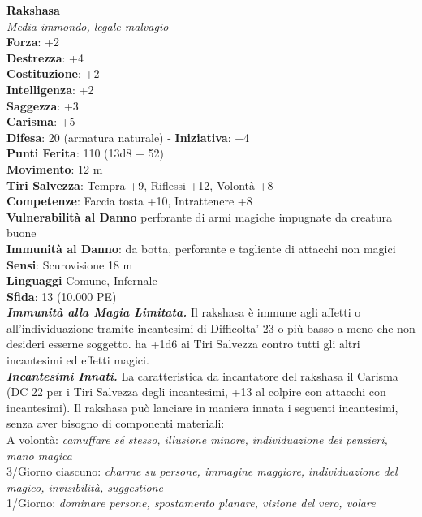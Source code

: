 \begin{multicols}{2}
\medskip\textbf{Rakshasa}\\
\emph{Media immondo, legale malvagio}\\
\textbf{Forza}: +2\\
\textbf{Destrezza}: +4\\
\textbf{Costituzione}: +2\\
\textbf{Intelligenza}: +2\\
\textbf{Saggezza}: +3\\
\textbf{Carisma}: +5\\
\textbf{Difesa}: 20 (armatura naturale) - \textbf{Iniziativa}: +4\\
\textbf{Punti Ferita}: 110 (13d8 + 52)\\
\textbf{Movimento}: 12 m\\
\textbf{Tiri Salvezza}: Tempra +9, Riflessi +12, Volontà +8 \\
\textbf{Competenze}: Faccia tosta +10, Intrattenere +8\\
\textbf{Vulnerabilità al Danno} perforante di armi magiche impugnate da creatura buone\\
\textbf{Immunità al Danno}: da botta, perforante e tagliente di attacchi non magici\\
\textbf{Sensi}: Scurovisione 18 m\\
\textbf{Linguaggi} Comune, Infernale\\
\textbf{Sfida}: 13 (10.000 PE)\smallskip\\
\emph{\textbf{Immunità alla Magia Limitata.}} Il rakshasa è immune agli affetti o all'individuazione tramite incantesimi di Difficolta' 23 o più basso a meno che non desideri esserne soggetto. ha +1d6 ai Tiri Salvezza contro tutti gli altri incantesimi ed effetti magici.\\
\emph{\textbf{Incantesimi Innati.}} La caratteristica da incantatore del rakshasa il Carisma (DC  22 per i Tiri Salvezza degli incantesimi, +13 al colpire  con attacchi con incantesimi). Il rakshasa può lanciare in maniera  innata i seguenti incantesimi, senza aver bisogno di componenti  materiali:\\
A volontà: \emph{camuffare sé stesso, illusione minore, individuazione} \emph{dei pensieri, mano magica}\\
3/Giorno ciascuno: \emph{charme su persone, immagine maggiore,} \emph{individuazione del magico, invisibilità, suggestione}\\
1/Giorno: \emph{dominare persone, spostamento planare, visione del} \emph{vero, volare}\\

\end{multicols}
